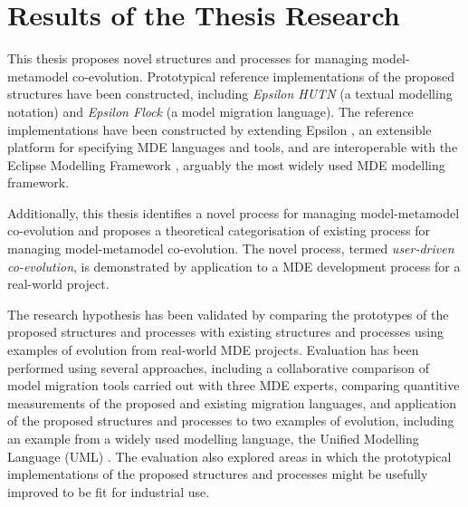 
\section{Results of the Thesis Research}
\label{sec:research_results}

This thesis proposes novel structures and processes for managing model-met\-amo\-del co-evolution. Prototypical reference implementations of the proposed structures have been constructed, including \emph{Epsilon HUTN} (a textual modelling notation) and \emph{Epsilon Flock} (a model migration language). The reference implementations have been constructed by extending Epsilon \cite{kolovos09thesis}, an extensible platform for specifying MDE languages and tools, and are interoperable with the Eclipse Modelling Framework \cite{steinberg09emf}, arguably the most widely used MDE modelling framework.

Additionally, this thesis identifies a novel process for managing model-metamodel co-evolution and proposes a theoretical categorisation of existing process for managing model-metamodel co-evolution. The novel process, termed \emph{user-driven co-evolution}, is demonstrated by application to a MDE development process for a real-world project.

The research hypothesis has been validated by comparing the prototypes of the proposed structures and processes with existing structures and processes using examples of evolution from real-world MDE projects. Evaluation has been performed using several approaches, including a collaborative comparison of model migration tools carried out with three MDE experts, comparing quantitive measurements of the proposed and existing migration languages, and application of the proposed structures and processes to two examples of evolution, including an example from a widely used modelling language, the Unified Modelling Language (UML) \cite{uml212}. The evaluation also explored areas in which the prototypical implementations of the proposed structures and processes might be usefully improved to be fit for industrial use.




